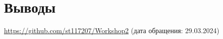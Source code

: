 \section{Выводы}



\begin{thebibliography}{9}

\url{https://github.com/st117207/Workshop2}  (дата обращения: 29.03.2024) 


\end{thebibliography}

